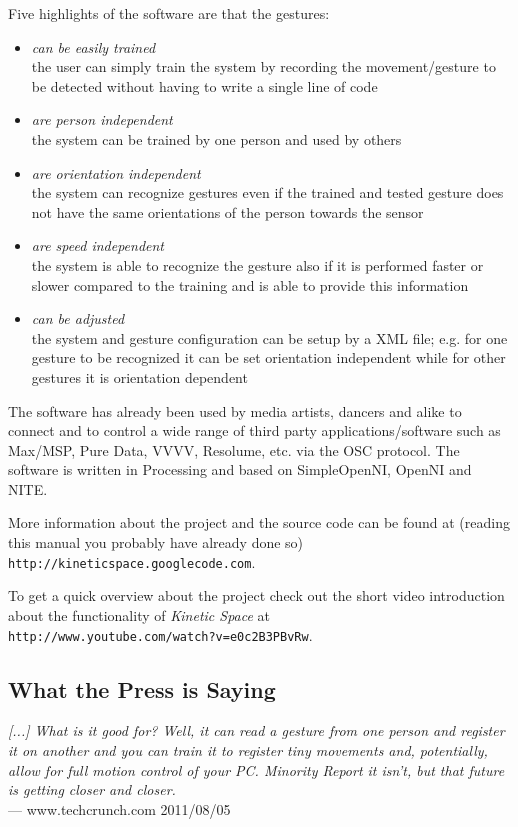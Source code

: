 \documentclass[titlepage,12pt,a4paper]{article}
\begin{document}
Five highlights of the software are that the gestures:

\begin{itemize}
	\item \emph{can be easily trained}\\ the user can simply train the system 
      by recording the movement/gesture to be detected without having to write a single line of code 

	\item \emph{are person independent}\\ the system can be trained by one 
      person and used by others 

	\item \emph{are orientation independent}\\ the system can recognize gestures even if the trained and tested gesture does not have the same orientations of the person towards the sensor

	\item \emph{are speed independent}\\ the system is able to recognize the
      gesture also if it is performed faster or slower compared to the training and is able to provide this information

	\item \emph{can be adjusted}\\ the system and gesture configuration can be setup by a XML file; e.g. for one gesture to be recognized it can be set orientation independent while for other gestures it is orientation dependent
\end{itemize}

The software has already been used by media artists, dancers and alike to 
connect and to control a wide range of third party applications/software such as Max/MSP, Pure Data, VVVV, Resolume, etc. 
via the OSC protocol. The software is written in Processing and based on 
SimpleOpenNI, OpenNI and NITE.

More information about the project and the source code can be found at (reading this manual you probably have already done so) \\
\texttt{http://kineticspace.googlecode.com}.

To get a quick overview about the project check out the short video introduction about the functionality of \emph{Kinetic Space} at \\ \texttt{http://www.youtube.com/watch?v=e0c2B3PBvRw}.

\subsection{What the Press is Saying}
\emph{[...] What is it good for? Well, it can read a gesture from one person and register it on another and you can train it to register tiny movements and, potentially, allow for full motion control of your PC. Minority Report it isn't, but that future is getting closer and closer.}\\
--- www.techcrunch.com 2011/08/05
\end{document}
